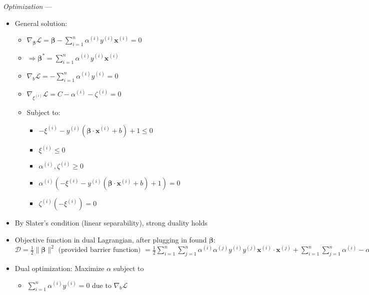 \emph{Optimization} ---
\begin{itemize}
    \item General solution:
    \begin{itemize}
        \item $\nabla_{\boldsymbol{\beta}} \mathcal{L} =  \boldsymbol{\beta} - \sum_{i=1}^n \alpha^{(i)} y^{(i)} \boldsymbol{x}^{(i)} = 0$
        \item $\Rightarrow \boldsymbol{\beta}^{*} = \sum_{i=1}^n \alpha^{(i)} y^{(i)} \boldsymbol{x}^{(i)}$
        \item $\nabla_b \mathcal{L} = - \sum_{i=1}^n \alpha^{(i)} y^{(i)} = 0$
        \item $\nabla_{\xi^{(i)}} \mathcal{L} = C - \alpha^{(i)} - \zeta^{(i)} = 0$
        \item Subject to:
        \begin{itemize}
            \item $- \xi^{(i)} - y^{(i)} (\boldsymbol{\beta} \cdot \boldsymbol{x}^{(i)} + b) + 1 \leq 0$
            \item $\xi^{(i)} \leq 0$
            \item $\alpha^{(i)}, \zeta^{(i)} \geq 0$
            \item $\alpha^{(i)} (- \xi^{(i)} - y^{(i)} (\boldsymbol{\beta} \cdot \boldsymbol{x}^{(i)} + b) + 1) = 0$
            \item $\zeta^{(i)} (- \xi^{(i)}) = 0$
        \end{itemize}
    \end{itemize}
    \item By Slater's condition (linear separability), strong duality holds
    \item Objective function in dual Lagrangian, after plugging in found $\boldsymbol{\beta}$: $\mathcal{D} = \frac{1}{2} \| \boldsymbol{\beta} \|^2  \textrm{ (provided barrier function) }= \frac{1}{2}  \sum_{i=1}^n  \sum_{j=1}^n \alpha^{(i)}\alpha^{(j)} y^{(i)}y^{(j)} \boldsymbol{x}^{(i)} \cdot \boldsymbol{x}^{(j)} + \sum_{i=1}^n  \sum_{j=1}^n \alpha^{(i)} - \alpha^{(i)}\alpha^{(j)} y^{(i)}y^{(j)} \boldsymbol{x}^{(i)} \cdot \boldsymbol{x}^{(j)} = \sum_{i=1}^n \alpha^{(i)} - \frac{1}{2}  \sum_{i=1}^n  \sum_{j=1}^n \alpha^{(i)}\alpha^{(j)} y^{(i)}y^{(j)} \boldsymbol{x}^{(i)} \cdot \boldsymbol{x}^{(j)}$
    \item Dual optimization: Maximize $\alpha$ subject to 
    \begin{itemize}
        \item $\sum_{i=1}^n \alpha^{(i)} y^{(i)} = 0$ due to $\nabla_b \mathcal{L}$

\end{itemize}
\end{itemize}
